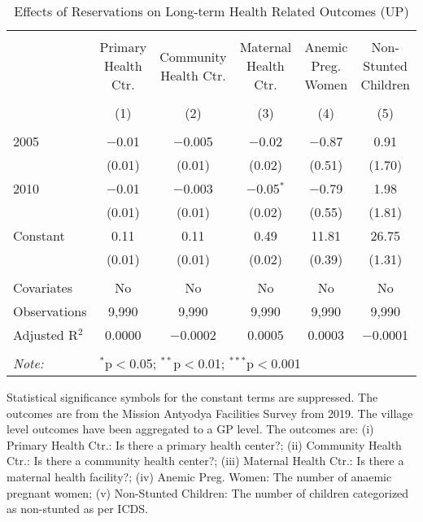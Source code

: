 \begin{sidewaystable}[!htbp]
\centering
\begin{threeparttable}

  \caption{Effects of Reservations on Long-term Health Related Outcomes (UP)} 
  \label{up_shrug_health_05_10} 
\scriptsize 
\begin{tabular}{@{\extracolsep{0pt}}lccccc} 
\\[-1.8ex]\hline 
\hline \\[-1.8ex] 
 & Primary Health Ctr. & Community Health Ctr. & Maternal Health Ctr. & Anemic Preg. Women & Non-Stunted Children \\ 
\\[-1.8ex] & (1) & (2) & (3) & (4) & (5)\\ 
\hline \\[-1.8ex] 
 2005 & $-$0.01 & $-$0.005 & $-$0.02 & $-$0.87 & 0.91 \\ 
  & (0.01) & (0.01) & (0.02) & (0.51) & (1.70) \\ 
  2010 & $-$0.01 & $-$0.003 & $-$0.05$^{*}$ & $-$0.79 & 1.98 \\ 
  & (0.01) & (0.01) & (0.02) & (0.55) & (1.81) \\ 
  Constant & 0.11 & 0.11 & 0.49 & 11.81 & 26.75 \\ 
  & (0.01) & (0.01) & (0.02) & (0.39) & (1.31) \\ 
 \hline \\[-1.8ex] 
Covariates & No & No & No & No & No \\ 
Observations & 9,990 & 9,990 & 9,990 & 9,990 & 9,990 \\ 
Adjusted R$^{2}$ & 0.0000 & $-$0.0002 & 0.0005 & 0.0003 & $-$0.0001 \\ 
\hline 
\hline \\[-1.8ex] 
\textit{Note:}  & \multicolumn{5}{l}{$^{*}$p$<$0.05; $^{**}$p$<$0.01; $^{***}$p$<$0.001} \\ 
\end{tabular} 
\begin{tablenotes}[flushleft]
\setlength{\itemindent}{0em}
\scriptsize
\item Statistical significance symbols for the constant terms are suppressed. The outcomes are from the Mission Antyodya Facilities Survey from 2019. The village level outcomes have been aggregated to a GP level. The outcomes are:
                    (i) Primary Health Ctr.: Is there a primary health center?;
                    (ii) Community Health Ctr.: Is there a community health center?;
                    (iii) Maternal Health Ctr.: Is there a maternal health facility?;
                    (iv) Anemic Preg. Women: The number of anaemic pregnant women;
                    (v) Non-Stunted Children: The number of children categorized as non-stunted as per ICDS.
\end{tablenotes}
\end{threeparttable}
\end{sidewaystable}
